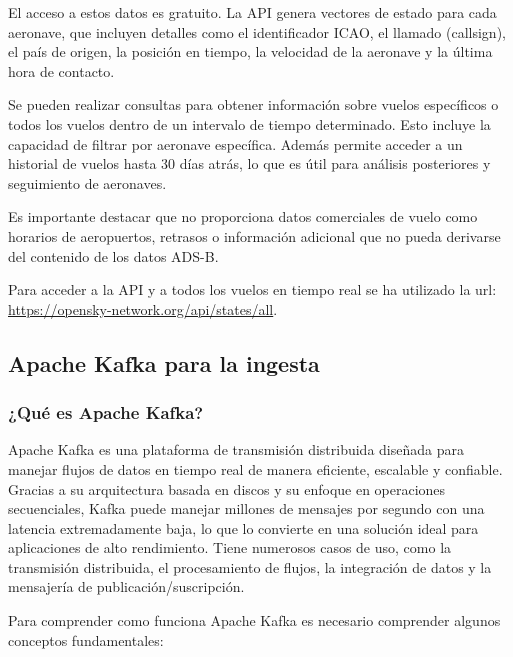 \documentclass{article}
\begin{document}
El acceso a estos datos es gratuito. La API genera vectores de estado para cada aeronave, que incluyen detalles como el identificador ICAO, el llamado (callsign), el país de origen, la posición en tiempo, la velocidad de la aeronave y la última hora de contacto.

Se pueden realizar consultas para obtener información sobre vuelos específicos o todos los vuelos dentro de un intervalo de tiempo determinado. Esto incluye la capacidad de filtrar por aeronave específica.
Además permite acceder a un historial de vuelos hasta 30 días atrás, lo que es útil para análisis posteriores y seguimiento de aeronaves.

Es importante destacar que no proporciona datos comerciales de vuelo como horarios de aeropuertos, retrasos o información adicional que no pueda derivarse del contenido de los datos ADS-B.

Para acceder a la API y a todos los vuelos en tiempo real se ha utilizado la url: \url{https://opensky-network.org/api/states/all}.

\subsection{Apache Kafka para la ingesta}
\subsubsection{¿Qué es Apache Kafka?}

Apache Kafka es una plataforma de transmisión distribuida diseñada para manejar flujos de datos en tiempo real de manera eficiente, escalable y confiable. Gracias a su arquitectura basada en discos y su enfoque en operaciones secuenciales, Kafka puede manejar millones de mensajes por segundo con una latencia extremadamente baja, lo que lo convierte en una solución ideal para aplicaciones de alto rendimiento.
Tiene numerosos casos de uso, como la transmisión distribuida, el procesamiento de flujos, la integración de datos y la mensajería de publicación/suscripción.

Para comprender como funciona Apache Kafka es necesario comprender algunos conceptos fundamentales:
\end{document}
